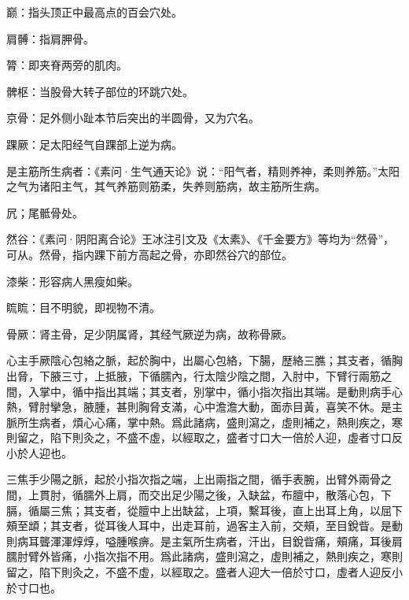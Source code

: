 \documentclass[12pt]{ctexbook}%
\begin{document}

\begin{jiaozhu}
	\item 巅：指头顶正中最高点的百会穴处。
	\item 肩髆：指肩胛骨。
	\item 膂：即夹脊两旁的肌肉。
	\item 髀枢：当股骨大转子部位的环跳穴处。
	\item 京骨：足外侧小趾本节后突出的半圆骨，又为穴名。
	\item 踝厥：足太阳经气自踝部上逆为病。
	\item 是主筋所生病者：《素问·生气通天论》说：“阳气者，精则养神，柔则养筋。”太阳之气为诸阳主气，其气养筋则筋柔，失养则筋病，故主筋所生病。
	\item 凥；尾骶骨处。
	\item 然谷：《素问·阴阳离合论》王冰注引文及《太素》、《千金要方》等均为“然骨”，可从。然骨，指内踝下前方高起之骨，亦即然谷穴的部位。
	\item 漆柴：形容病人黑瘦如柴。
	\item 䀮䀮：目不明貌，即视物不清。
	\item 骨厥：肾主骨，足少阴属肾，其经气厥逆为病，故称骨厥。
\end{jiaozhu}


\begin{yuanwen}
心主手厥陰心包絡之脈，起於胸中，出屬心包絡，下腸，歴絡三膲；其支者，循胸出脅，下腋三寸，上抵腋，下循臑內，行太陰少陰之間，入肘中，下臂行兩筋之間，入掌中，循中指出其端；其支者，別掌中，循小指次指出其端。是動則病手心熱，臂肘攣急，腋腫，甚則胸脅支滿，心中澹澹大動，面赤目黃，喜笑不休。是主脈所生病者，煩心心痛，掌中熱。爲此諸病，盛則瀉之，虛則補之，熱則疾之，寒則留之，陷下則灸之，不盛不虛，以經取之，盛者寸口大一倍於人迎，虛者寸口反小於人迎也。

三焦手少陽之脈，起於小指次指之端，上出兩指之間，循手表腕，出臂外兩骨之間，上貫肘，循臑外上肩，而交出足少陽之後，入缺盆，布膻中，散落心包，下膈，循屬三焦；其支者，從膻中上出缺盆，上項，繫耳後，直上出耳上角，以屈下頰至䪼；其支者，從耳後人耳中，出走耳前，過客主入前，交頰，至目銳眥。是動則病耳聾渾渾焞焞，嗌腫喉痹。是主氣所生病者，汗出，目銳眥痛，頰痛，耳後肩臑肘臂外皆痛，小指次指不用。爲此諸病，盛則瀉之，虛則補之，熱則疾之，寒則留之，陷下則灸之，不盛不虛，以經取之。盛者人迎大一倍於寸口，虛者人迎反小於寸口也。
\end{yuanwen}

\end{document}
